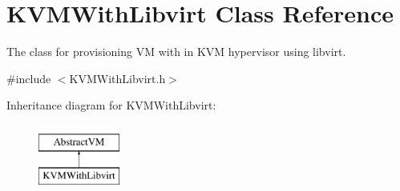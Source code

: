 \hypertarget{classKVMWithLibvirt}{\section{\-K\-V\-M\-With\-Libvirt \-Class \-Reference}
\label{classKVMWithLibvirt}
}


\-The class for provisioning \-V\-M with in \-K\-V\-M hypervisor using libvirt.  




{\ttfamily \#include $<$\-K\-V\-M\-With\-Libvirt.\-h$>$}

\-Inheritance diagram for \-K\-V\-M\-With\-Libvirt\-:\begin{figure}[H]
\begin{center}
\leavevmode
\includegraphics[height=2.000000cm]{classKVMWithLibvirt}
\end{center}
\end{figure}
